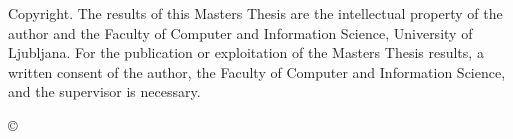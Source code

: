\thispagestyle{empty}
\vspace*{\fill}
{\noindent\footnotesize
{\sc Copyright}. The results of this Masters Thesis are the intellectual property of the author and the Faculty of Computer and Information Science, University of Ljubljana. For the publication or exploitation of the Masters Thesis results, a written consent of the author, the Faculty of Computer and Information Science, and the supervisor is necessary.}
\begin{center}
{\footnotesize{\sc \copyright \myyear\ \myname}}
\end{center}